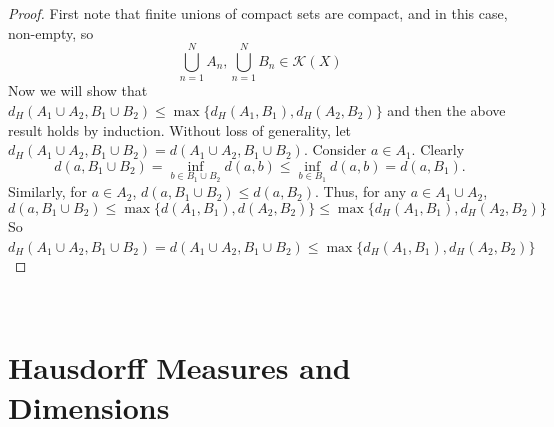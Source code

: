 \documentclass{article}
\theoremstyle{plain}
\theoremstyle{definition}
\theoremstyle{remark}
\begin{document}
\begin{proof}
    First note that finite unions of compact sets are compact, and in this case, non-empty, so \[\bigcup \limits _{n=1}^N A_n, \bigcup \limits _{n=1}^N B_n \in \mathcal{K}(X)\]Now we will show that $d_H(A_1 \cup A_2, B_1 \cup B_2) \le \max\{d_H(A_1, B_1), d_H(A_2, B_2)\}$ and then the above result holds by induction. Without loss of generality, let $d_H(A_1 \cup A_2, B_1 \cup B_2) = d(A_1 \cup A_2, B_1 \cup B_2)$.
Consider $a \in A_1$. Clearly \[d(a, B_1\cup B_2) = \inf \limits _{b\in B_1\cup B_2} d(a,b) \le \inf \limits _{b\in B_1} d(a,b) = d(a,B_1).\] Similarly, for $a \in A_2$, $d(a, B_1 \cup B_2) \le d(a, B_2)$. Thus, for any $a\in A_1 \cup A_2$, \[d(a, B_1 \cup B_2)  \le \max \{d(A_1,B_1), d(A_2, B_2) \} \le \max \{d_H(A_1, B_1), d_H(A_2, B_2)\}\] So $d_H(A_1\cup A_2, B_1 \cup B_2) = d(A_1\cup A_2, B_1 \cup B_2)  \le \max \{d_H(A_1,B_1), d_H(A_2, B_2)\}$
\end{proof}
~\\
\noindent{}


\newpage

\section{Hausdorff Measures and Dimensions}
\end{document}
